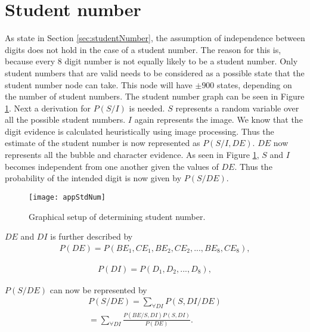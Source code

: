 \section{Student number}
As state in Section \ref{sec:studentNumber}, the assumption of independence between digits does not hold in the case of a student number. The reason for this is, because every 8 digit number is not equally likely to be a student number. Only student numbers that are valid needs to be considered as a possible state that the student number node can take. This node will have $\pm 900$ states, depending on the number of student numbers. The student number graph can be seen in Figure \ref{fig:stdNum}. Next a derivation for $P(S/I)$ is needed. $S$ represents a random variable over all the possible student numbers. $I$ again represents the image. We know that the digit evidence is calculated heuristically using image processing. Thus the estimate of the student number is now represented as $P(S/I,DE)$. $DE$ now represents all the bubble and character evidence. As seen in Figure \ref{fig:stdNum}, $S$ and $I$ becomes independent from one another given the values of $DE$. Thus the probability of the intended digit is now given by $P(S/DE)$.

\begin{figure}
  \centering
  \texttt{[image: appStdNum]}\\
  \caption{Graphical setup of determining student number.}
  \label{fig:stdNum}
\end{figure}

$DE$ and $DI$ is further described by 
\begin{align}
  P(DE) =  P(BE_1,CE_1,BE_2,CE_2,...,BE_8,CE_8),
\label{eqn:ansIndep}
\end{align}

\begin{align}
  P(DI) =  P(D_1,D_2,...,D_8),
\label{eqn:ansIndep2}
\end{align}

$P(S/DE)$ can now be represented by
\begin{align}
  P(S/DE)	=  \sum_{\forall DI}^{}  P(S,DI/DE)\\
  					=  \sum_{\forall DI}^{}  \frac{P(BE/S,DI)P(S,DI)}{P(DE)}.
\label{eqn:stdEqn2}
\end{align}

